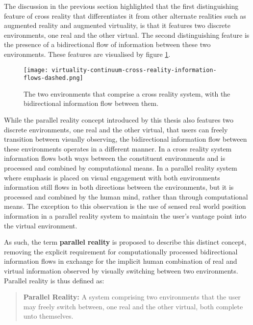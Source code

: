 The discussion in the previous section highlighted that the first distinguishing feature of cross reality that differentiates it from other alternate realities such as augmented reality and augmented virtuality, is that it features two discrete environments, one real and the other virtual. The second distinguishing feature is the presence of a bidirectional flow of information between these two environments. These features are visualised by figure \ref{virtuality-continuum-cross-reality-information-flows-dashed.png}.

\begin{figure}[h]
	\begin{center}
		\texttt{[image: virtuality-continuum-cross-reality-information-flows-dashed.png]}
		\caption{The two environments that comprise a cross reality system, with the bidirectional information flow between them.}
		\label{virtuality-continuum-cross-reality-information-flows-dashed.png}
	\end{center}
\end{figure}

While the parallel reality concept introduced by this thesis also features two discrete environments, one real and the other virtual, that users can freely transition between visually observing, the bidirectional information flow between these environments operates in a different manner. In a cross reality system information flows both ways between the constituent environments and is processed and combined by computational means. In a parallel reality system where emphasis is placed on visual engagement with both environments information still flows in both directions between the environments, but it is processed and combined by the human mind, rather than through computational means. The exception to this observation is the use of sensed real world position information in a parallel reality system to maintain the user's vantage point into the virtual environment.

As such, the term \textbf{parallel reality} is proposed to describe this distinct concept, removing the explicit requirement for computationally processed bidirectional information flows in exchange for the implicit human combination of real and virtual information observed by visually switching between two environments. Parallel reality is thus defined as:

\begin{quote}
	\textbf{Parallel Reality:} A system comprising two environments that the user may freely switch between, one real and the other virtual, both complete unto themselves.
\end{quote}

